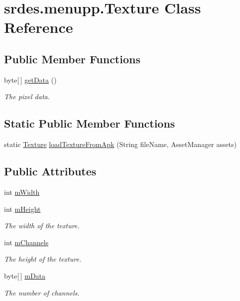 \hypertarget{classsrdes_1_1menupp_1_1_texture}{\section{srdes.\-menupp.\-Texture \-Class \-Reference}
\label{classsrdes_1_1menupp_1_1_texture}
}
\subsection*{\-Public \-Member \-Functions}
\begin{DoxyCompactItemize}
\item 
byte\mbox{[}$\,$\mbox{]} \hyperlink{classsrdes_1_1menupp_1_1_texture_aee5524c736055b2dbf39556008133eea}{get\-Data} ()
\begin{DoxyCompactList}\small\item\em \-The pixel data. \end{DoxyCompactList}\end{DoxyCompactItemize}
\subsection*{\-Static \-Public \-Member \-Functions}
\begin{DoxyCompactItemize}
\item 
static \hyperlink{classsrdes_1_1menupp_1_1_texture}{\-Texture} \hyperlink{classsrdes_1_1menupp_1_1_texture_a676f59327861a9e03c2a9ebc19279d36}{load\-Texture\-From\-Apk} (\-String file\-Name, \-Asset\-Manager assets)
\end{DoxyCompactItemize}
\subsection*{\-Public \-Attributes}
\begin{DoxyCompactItemize}
\item 
int \hyperlink{classsrdes_1_1menupp_1_1_texture_a7bae8644a8a005c53dd95211e5147346}{m\-Width}
\item 
int \hyperlink{classsrdes_1_1menupp_1_1_texture_a6843fe62cf39bb8fe17ba56da1ab754b}{m\-Height}
\begin{DoxyCompactList}\small\item\em \-The width of the texture. \end{DoxyCompactList}\item 
int \hyperlink{classsrdes_1_1menupp_1_1_texture_af84573ecaeec54fe307aa1958eec2727}{m\-Channels}
\begin{DoxyCompactList}\small\item\em \-The height of the texture. \end{DoxyCompactList}\item 
byte\mbox{[}$\,$\mbox{]} \hyperlink{classsrdes_1_1menupp_1_1_texture_a9e705e4b34593939d4827502c6ded591}{m\-Data}
\begin{DoxyCompactList}\small\item\em \-The number of channels. \end{DoxyCompactList}\end{DoxyCompactItemize}


